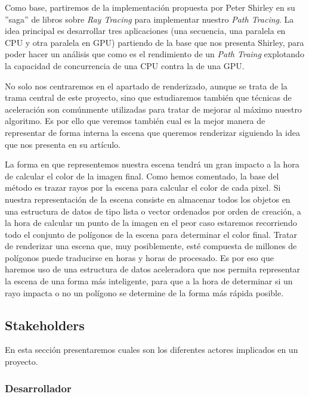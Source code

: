 \documentclass[titlepage,12pt]{report}
\begin{document}
Como base, partiremos de la implementación propuesta por Peter Shirley en su ''saga'' de libros sobre \textit{Ray Tracing} \citep{ShirleyRTA, ShirleyRTB, ShirleyRTC} para implementar nuestro \textit{Path Tracing}. La idea principal es desarrollar tres aplicaciones (una secuencia, una paralela en CPU y otra paralela en GPU) partiendo de la base que nos presenta Shirley, para poder hacer un análisis que como es el rendimiento de un \textit{Path Traing} explotando la capacidad de concurrencia de una CPU contra la de una GPU.

No solo nos centraremos en el apartado de renderizado, aunque se trata de la trama central de este proyecto, sino que estudiaremos también que técnicas de aceleración son comúnmente utilizadas para tratar de mejorar al máximo nuestro algoritmo. Es por ello que veremos también cual es la mejor manera de representar de forma interna la escena que queremos renderizar siguiendo la idea que nos presenta \citep{Karras2012} en su artículo.

La forma en que representemos nuestra escena tendrá un gran impacto a la hora de calcular el color de la imagen final. Como hemos comentado, la base del método es trazar rayos por la escena para calcular el color de cada pixel. Si nuestra representación de la escena consiste en almacenar todos los objetos en una estructura de datos de tipo lista o vector ordenados por orden de creación, a la hora de calcular un punto de la imagen en el peor caso estaremos recorriendo todo el conjunto de polígonos de la escena para determinar el color final. Tratar de renderizar una escena que, muy posiblemente, esté compuesta de millones de polígonos puede traducirse en horas y horas de procesado. Es por eso que haremos uso de una estructura de datos aceleradora que nos permita representar la escena de una forma más inteligente, para que a la hora de determinar si un rayo impacta o no un polígono se determine de la forma más rápida posible.

\subsection{Stakeholders}

En esta sección presentaremos cuales son los diferentes actores implicados en un proyecto.

\subsubsection{Desarrollador}
\end{document}
